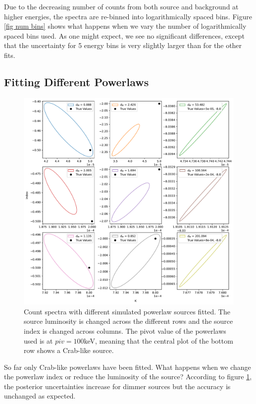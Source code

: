 \documentclass{report}
\begin{document}
Due to the decreasing number of counts from both source and background at higher energies, the spectra are re-binned into logarithmically spaced bins. Figure \ref{fig num bins} shows what happens when we vary the number of logarithmically spaced bins used. As one might expect, we see no significant differences, except that the uncertainty for 5 energy bins is very slightly larger than for the other fits.


\subsection{Fitting Different Powerlaws}

\begin{figure}[h]
  \centering
  \includegraphics[width=\textwidth]{Images/Pure_Simulation/combined_plots_different_sources.pdf}
  \caption{Count spectra with different simulated powerlaw sources fitted. The source luminosity is changed across the different rows and the source index is changed across columns. The pivot value of the powerlaws used is at $piv=100$keV, meaning that the central plot of the bottom row shows a Crab-like source.}
  \label{fig diff powerlaws}
\end{figure}

So far only Crab-like powerlaws have been fitted. What happens when we change the powerlaw index or reduce the luminosity of the source? According to figure \ref{fig diff powerlaws}, the posterior uncertainties increase for dimmer sources but the accuracy is unchanged as expected. 
\end{document}
